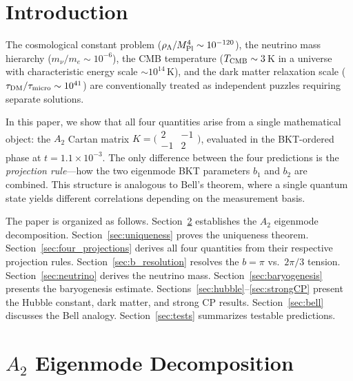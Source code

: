 \documentclass[twocolumn,preprintnumbers,amsmath,amssymb,prd]{revtex4-2}
\begin{document}
\maketitle

\section{Introduction}
\label{sec:intro}

The cosmological constant problem ($\rho_\Lambda/M_{\rm Pl}^4 \sim 10^{-120}$), the neutrino mass hierarchy ($m_\nu/m_e \sim 10^{-6}$), the CMB temperature ($T_{\rm CMB} \sim 3\,$K in a universe with characteristic energy scale $\sim 10^{14}\,$K), and the dark matter relaxation scale ($\tau_{\rm DM}/\tau_{\rm micro} \sim 10^{41}$) are conventionally treated as independent puzzles requiring separate solutions.

In this paper, we show that all four quantities arise from a single mathematical object: the $A_2$ Cartan matrix $K = \bigl(\begin{smallmatrix}2 & -1\\ -1 & 2\end{smallmatrix}\bigr)$, evaluated in the BKT-ordered phase at $t = 1.1\times10^{-3}$.
The only difference between the four predictions is the \emph{projection rule}---how the two eigenmode BKT parameters $b_1$ and $b_2$ are combined.
This structure is analogous to Bell's theorem, where a single quantum state yields different correlations depending on the measurement basis.

The paper is organized as follows.
Section~\ref{sec:cartan} establishes the $A_2$ eigenmode decomposition.
Section~\ref{sec:uniqueness} proves the uniqueness theorem.
Section~\ref{sec:four_projections} derives all four quantities from their respective projection rules.
Section~\ref{sec:b_resolution} resolves the $b = \pi$ vs.\ $2\pi/3$ tension.
Section~\ref{sec:neutrino} derives the neutrino mass.
Section~\ref{sec:baryogenesis} presents the baryogenesis estimate.
Sections~\ref{sec:hubble}--\ref{sec:strongCP} present the Hubble constant, dark matter, and strong CP results.
Section~\ref{sec:bell} discusses the Bell analogy.
Section~\ref{sec:tests} summarizes testable predictions.

\section{$A_2$ Eigenmode Decomposition}
\label{sec:cartan}
\end{document}
